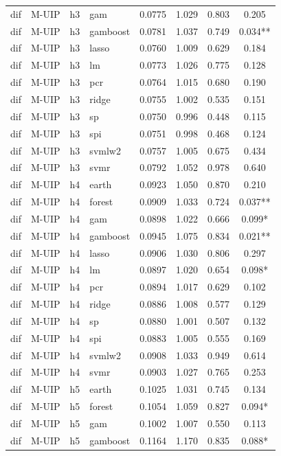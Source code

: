 \begin{ThreePartTable}
\begin{longtable}[t]{llclcccc}
dif & M-UIP & h3 & gam & 0.0775 & 1.029 & 0.803 & 0.205\\
dif & M-UIP & h3 & gamboost & 0.0781 & 1.037 & 0.749 & 0.034**\\
dif & M-UIP & h3 & lasso & 0.0760 & 1.009 & 0.629 & 0.184\\
dif & M-UIP & h3 & lm & 0.0773 & 1.026 & 0.775 & 0.128\\
dif & M-UIP & h3 & pcr & 0.0764 & 1.015 & 0.680 & 0.190\\
dif & M-UIP & h3 & ridge & 0.0755 & 1.002 & 0.535 & 0.151\\
dif & M-UIP & h3 & sp & 0.0750 & 0.996 & 0.448 & 0.115\\
dif & M-UIP & h3 & spi & 0.0751 & 0.998 & 0.468 & 0.124\\
dif & M-UIP & h3 & svmlw2 & 0.0757 & 1.005 & 0.675 & 0.434\\
dif & M-UIP & h3 & svmr & 0.0792 & 1.052 & 0.978 & 0.640\\
\addlinespace
dif & M-UIP & h4 & earth & 0.0923 & 1.050 & 0.870 & 0.210\\
dif & M-UIP & h4 & forest & 0.0909 & 1.033 & 0.724 & 0.037**\\
dif & M-UIP & h4 & gam & 0.0898 & 1.022 & 0.666 & 0.099*\\
dif & M-UIP & h4 & gamboost & 0.0945 & 1.075 & 0.834 & 0.021**\\
dif & M-UIP & h4 & lasso & 0.0906 & 1.030 & 0.806 & 0.297\\
dif & M-UIP & h4 & lm & 0.0897 & 1.020 & 0.654 & 0.098*\\
dif & M-UIP & h4 & pcr & 0.0894 & 1.017 & 0.629 & 0.102\\
dif & M-UIP & h4 & ridge & 0.0886 & 1.008 & 0.577 & 0.129\\
dif & M-UIP & h4 & sp & 0.0880 & 1.001 & 0.507 & 0.132\\
dif & M-UIP & h4 & spi & 0.0883 & 1.005 & 0.555 & 0.169\\
dif & M-UIP & h4 & svmlw2 & 0.0908 & 1.033 & 0.949 & 0.614\\
dif & M-UIP & h4 & svmr & 0.0903 & 1.027 & 0.765 & 0.253\\
\addlinespace
dif & M-UIP & h5 & earth & 0.1025 & 1.031 & 0.745 & 0.134\\
dif & M-UIP & h5 & forest & 0.1054 & 1.059 & 0.827 & 0.094*\\
dif & M-UIP & h5 & gam & 0.1002 & 1.007 & 0.550 & 0.113\\
dif & M-UIP & h5 & gamboost & 0.1164 & 1.170 & 0.835 & 0.088*\\

\end{longtable}
\end{ThreePartTable}
